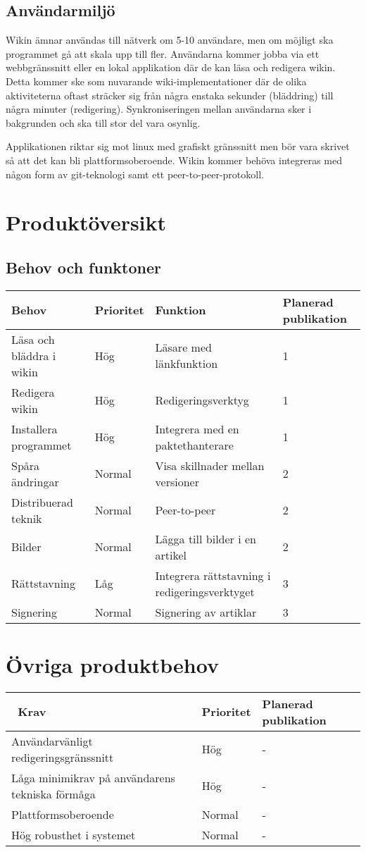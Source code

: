 \subsection{Användarmiljö}
Wikin ämnar användas till nätverk om 5-10 användare, men om möjligt ska programmet gå att skala upp till fler. Användarna kommer jobba via ett webbgränssnitt eller en lokal applikation där de kan läsa och redigera wikin. Detta kommer ske som nuvarande wiki-implementationer där de olika aktiviteterna oftast sträcker sig från några enstaka sekunder (bläddring) till några minuter (redigering). Synkroniseringen mellan användarna sker i bakgrunden och ska till stor del vara osynlig.

Applikationen riktar sig mot linux med grafiskt gränssnitt men bör vara skrivet så att det kan bli plattformsoberoende. Wikin kommer behöva integreras med någon form av git-teknologi samt ett peer-to-peer-protokoll.
\section{Produktöversikt}
\subsection*{Behov och funktoner}
\begin{tabular}{|l|l|l|l|}
\hline
Behov & Prioritet & Funktion & Planerad publikation \\
\hline
Läsa och bläddra i wikin & Hög & Läsare med länkfunktion & 1 \\
\hline
Redigera wikin & Hög & Redigeringsverktyg & 1 \\
\hline
Installera programmet & Hög & Integrera med en paktethanterare & 1 \\
\hline
Spåra ändringar & Normal & Visa skillnader mellan versioner & 2 \\
\hline
Distribuerad teknik & Normal & Peer-to-peer & 2 \\
\hline 
Bilder & Normal & Lägga till bilder i en artikel & 2 \\
\hline
Rättstavning & Låg & Integrera rättstavning i redigeringsverktyget & 3 \\
\hline
Signering & Normal & Signering av artiklar & 3 \\
\hline
\end{tabular}
\section{Övriga produktbehov}
\begin{tabular}{|l|l|l|}
\hline\
Krav & Prioritet & Planerad publikation \\
\hline
Användarvänligt redigeringsgränssnitt & Hög & - \\
\hline
Låga minimikrav på användarens tekniska förmåga & Hög & - \\
\hline
Plattformsoberoende & Normal & - \\
\hline
Hög robusthet i systemet & Normal & - \\
\hline
\end{tabular}

